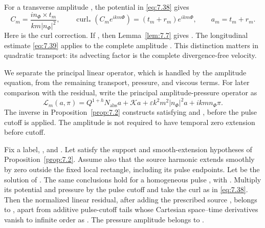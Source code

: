 For a transverse amplitude , the potential in \eqref{eq:7.38} gives
\[
C_m=\frac{i n_\Phi\times t_m}{km|n_\Phi|^2},
\qquad
\operatorname{curl}_*(C_me^{ikm\Phi})=(t_m+r_m)e^{ikm\Phi},
\qquad
a_m=t_m+r_m.
\]
Here  is the curl correction. If
, then Lemma~\ref{lem:7.7} gives
. The longitudinal estimate \eqref{eq:7.39}
applies to the complete amplitude . This distinction matters in quadratic
transport: its advecting factor is the complete divergence-free velocity.

We separate the principal linear operator, which is handled by the amplitude equation, from the
remaining transport, pressure, and viscous terms. For later comparison with the residual, write the
principal amplitude-pressure operator as
\begin{equation}
\mathscr L_m(a,\pi)=Q^{1+h}N_{\mathrm{abs}}a+\mathcal Ka
+\varepsilon k^2m^2|n_\Phi|^2a+ikmn_\Phi\pi.
\tag{9.1}\label{eq:9.1}
\end{equation}
The inverse in Proposition~\ref{prop:7.2} constructs
 satisfying
 and
, before the pulse cutoff is applied. The amplitude
 is not required to have temporal zero extension before cutoff.

\begin{proposition}\label{prop:9.1}
Fix a label, , and
. Let  satisfy the
support and smooth-extension hypotheses of Proposition~\ref{prop:7.2}. Assume also that the source
harmonic  extends smoothly by zero outside the fixed local
rectangle, including its pulse endpoints. Let  be the solution of
. The same conclusions hold for a homogeneous
pulse , with . Multiply its
potential and pressure by the pulse cutoff and take the curl as in \eqref{eq:7.38}. Then the
normalized linear residual, after adding the prescribed source
, belongs to
, apart from additive pulse-cutoff tails whose
Cartesian space--time derivatives vanish to infinite order as .
The pressure amplitude  belongs to
.
\end{proposition}

